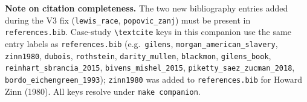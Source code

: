 \documentclass[12pt]{article}
\begin{document}
\bigskip
\noindent\textbf{Note on citation completeness.}  The two new
bibliography entries added during the V3 fix (\texttt{lewis\_race},
\texttt{popovic\_zanj}) must be present in \texttt{references.bib}.
Case-study \verb|\textcite| keys in this companion use the same entry
labels as \texttt{references.bib} (e.g.\ \texttt{gilens},
\texttt{morgan\_american\_slavery}, \texttt{zinn1980}, \texttt{dubois},
\texttt{rothstein}, \texttt{darity\_mullen}, \texttt{blackmon},
\texttt{gilens\_book}, \texttt{reinhart\_sbrancia\_2015},
\texttt{bivens\_mishel\_2015}, \texttt{piketty\_saez\_zucman\_2018},
\texttt{bordo\_eichengreen\_1993}); \texttt{zinn1980} was added to
\texttt{references.bib} for Howard Zinn (1980).  All keys resolve under
\texttt{make companion}.

\printbibliography
\end{document}
